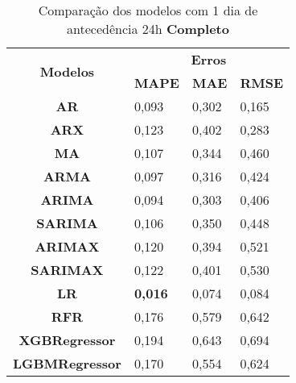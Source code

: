 \begin{table}[H]
	\centering
	\caption{Comparação dos modelos com 1 dia de antecedência 24h \textbf{Completo} }\label{tb:1-24cm}
	\begin{tabular}{@{}clll@{}}
		\toprule
		\multirow{2}{*}{\textbf{Modelos}} & \multicolumn{3}{c}{\textbf{Erros}}                                                                       \\ \cmidrule(l){2-4} 
		& \multicolumn{1}{c}{\textbf{MAPE}} & \multicolumn{1}{c}{\textbf{MAE}} & \multicolumn{1}{c}{\textbf{RMSE}} \\ \hline
\textbf{AR}                       & 0,093                             & 0,302                            & 0,165                             \\
\textbf{ARX}                      & 0,123                             & 0,402                            & 0,283                             \\
\textbf{MA}                       & 0,107                             & 0,344                            & 0,460                             \\
\textbf{ARMA}                     & 0,097                             & 0,316                            & 0,424                             \\
\textbf{ARIMA}                    & 0,094                             & 0,303                            & 0,406                             \\
\textbf{SARIMA}                   & 0,106                             & 0,350                            & 0,448                             \\
\textbf{ARIMAX}                   & 0,120                             & 0,394                            & 0,521                             \\
\textbf{SARIMAX}                  & 0,122                             & 0,401                            & 0,530                             \\
\textbf{LR}                       & \textbf{0,016}                             & 0,074                            & 0,084                             \\
\textbf{RFR}                      & 0,176                             & 0,579                            & 0,642                             \\
\textbf{XGBRegressor}             & 0,194                             & 0,643                            & 0,694                             \\
\textbf{LGBMRegressor}            & 0,170                             & 0,554                            & 0,624                             \\ \bottomrule
	\end{tabular}

\end{table}


